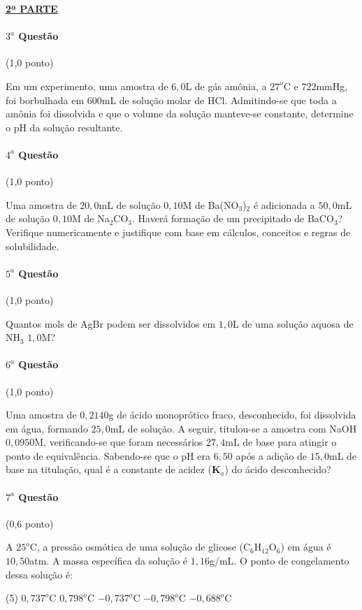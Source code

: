 \documentclass[12pt,a4paper]{article}
\begin{document}
\begin{center}
\underline{\textbf{2ª PARTE}}
\end{center}

\paragraph{$3^a$ Questão} (1,0 ponto)

Em um experimento, uma amostra de $6,0$L de gás amônia, a $27^o$C e $722$mmHg, foi borbulhada em $600$mL de solução 
molar de HCl. Admitindo-se que toda a amônia foi dissolvida e que o volume da solução manteve-se constante, determine o pH da solução resultante.

\paragraph{$4^a$ Questão} (1,0 ponto)

Uma amostra de $20,0$mL de solução $0,10$M de Ba(NO$_3$)$_2$ é adicionada a $50,0$mL de solução $0,10$M de Na$_2$CO$_3$. Haverá 
formação de um precipitado de BaCO$_3$? Verifique numericamente e justifique com base em cálculos, conceitos e regras de solubilidade.

\paragraph{$5^a$ Questão} (1,0 ponto)

Quantos mols de AgBr podem ser dissolvidos em $1,0$L de uma solução aquosa de NH$_3$ $1,0$M? 

\paragraph{$6^a$ Questão} (1,0 ponto)

Uma amostra de $0,2140$g de ácido monoprótico fraco, desconhecido, foi dissolvida em água, formando $25,0$mL de solução. A seguir, 
titulou-se a amostra com NaOH $0,0950$M, verificando-se que foram necessários $27,4$mL de base para atingir o ponto de equivalência. Sabendo-se
que o pH era $6,50$ após a adição de $15,0$mL de base na titulação, qual é a constante de acidez (\textbf{K}$_a$) do ácido desconhecido? 

\paragraph{$7^a$ Questão} (0,6 ponto)

A $25^o$C, a pressão osmótica de uma solução de glicose (C$_6$H$_{12}$O$_6$) em água é $10,50$atm. A massa específica da 
solução é $1,16$g/mL. O ponto de congelamento dessa solução é:
\begin{tasks}(5)
\task $0,737^o$C
\task $0,798^o$C
\task $-0,737^o$C
\task $-0,798^o$C
\task $-0,688^o$C
\end{tasks}
\end{document}

